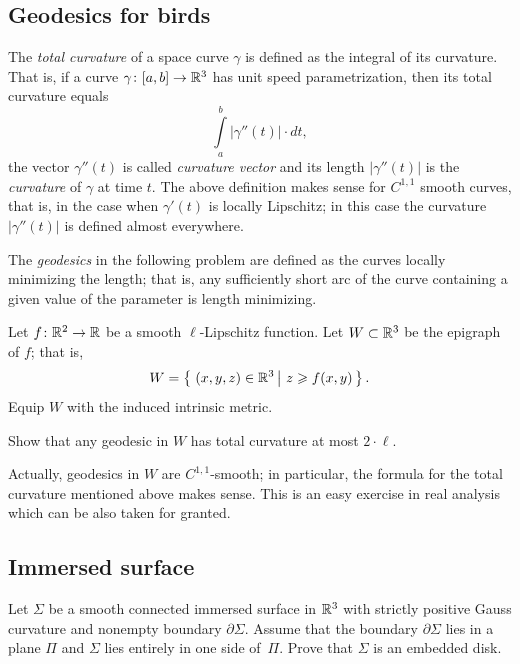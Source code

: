 \subsection*{Geodesics for birds}
\label{liberman}

The \emph{total curvature} of a space curve $\gamma$ is defined as the integral of its curvature.
That is, if a curve $\gamma\colon[a,b]\to\mathbb{R}^3$ has unit speed parametrization, 
then its total curvature equals 
\[\int\limits_a^b|\gamma''(t)|\cdot dt,\]
the vector $\gamma''(t)$ is called \emph{curvature vector} and its length $|\gamma''(t)|$ is the \emph{curvature} of $\gamma$ at time $t$.
The above definition makes sense for $C^{1,1}$ smooth curves,
that is, in the case when $\gamma'(t)$ is locally Lipschitz;
in this case the curvature $|\gamma''(t)|$ is defined almost everywhere.

The \emph{geodesics} in the following problem are defined as the curves locally minimizing the length;
that is, any sufficiently short arc of the curve containing a given value of the parameter is length minimizing.

\begin{pr}
Let $f\colon\mathbb{R}^2\to\mathbb{R}$ be a smooth $\ell$-Lipschitz function.
Let $W\subset \mathbb{R}^3$ be the epigraph of $f$;
that is,
$$W=\set{(x,y,z)\in\RR^3}{z\ge f(x,y)}.$$
Equip $W$ with the induced intrinsic metric.

Show that any geodesic in $W$ 
 has  total curvature at most $2\cdot\ell$. 
\end{pr}

Actually, geodesics in $W$ are $C^{1,1}$-smooth;
in particular, the formula for the total curvature mentioned above makes sense.
This is an easy exercise in real analysis which can be also taken for granted.


\subsection*{Immersed surface}
\label{Immersed surface}

\begin{pr}
Let $\Sigma$ be a smooth connected immersed surface in $\mathbb{R}^3$ with strictly positive Gauss curvature and nonempty boundary $\partial\Sigma$.
Assume that the boundary $\partial\Sigma$ lies in a plane $\Pi$
and $\Sigma$ lies entirely in one side of~$\Pi$.
Prove that $\Sigma$ is an embedded disk.
\end{pr}

